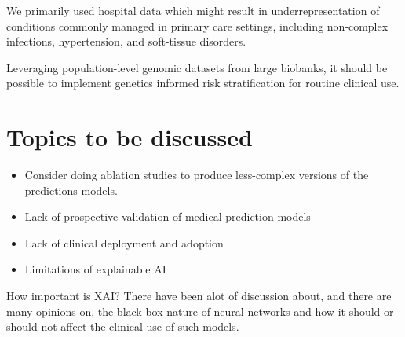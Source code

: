 We primarily used hospital data which might result in underrepresentation of
conditions commonly managed in primary care settings,
including non-complex infections, hypertension, and soft-tissue disorders.
~\autocite{finleyWhat2018}

Leveraging population-level genomic datasets from large biobanks,
it should be possible to implement genetics informed risk stratification
for routine clinical use.


\section{Topics to be discussed}
\begin{itemize}
    \item Consider doing ablation studies to produce less-complex versions
        of the predictions models.
    \item Lack of prospective validation of medical prediction models
    \item Lack of clinical deployment and adoption 
    \item Limitations of explainable AI
\end{itemize}


How important is XAI? 
There have been alot of discussion about, and there are many opinions on, 
the black-box nature of neural networks and 
how it should or should not affect the clinical use of such models.
\autocite{gunningXAI2019, vanderveldenExplainable2022}




